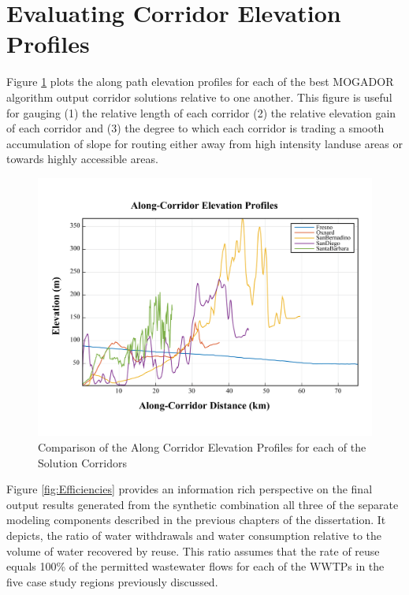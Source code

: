 \section{Evaluating Corridor Elevation Profiles}

Figure \ref{fig:ElevationProfiles} plots the along path elevation profiles for each of the best MOGADOR algorithm output corridor solutions relative to one another. This figure is useful for gauging (1) the relative length of each corridor (2) the relative elevation gain of each corridor and (3) the degree to which each corridor is trading a smooth accumulation of slope for routing either away from high intensity landuse areas or towards highly accessible areas. 

    \begin{figure}[!h]
        \begin{center}
        \includegraphics[width=5.5in]{figures/ElevationProfiles.png}
        \caption{Comparison of the Along Corridor Elevation Profiles for each of the Solution Corridors}
        \label{fig:ElevationProfiles}
        \end{center}
    \end{figure}
    
Figure \ref{fig:Efficiencies} provides an information rich perspective on the final output results generated from the synthetic combination all three of the separate modeling components described in the previous chapters of the dissertation. It depicts, the ratio of water withdrawals and water consumption relative to the volume of water recovered by reuse. This ratio assumes that the rate of reuse equals 100\% of the permitted wastewater flows for each of the WWTPs in the five case study regions previously discussed. 

